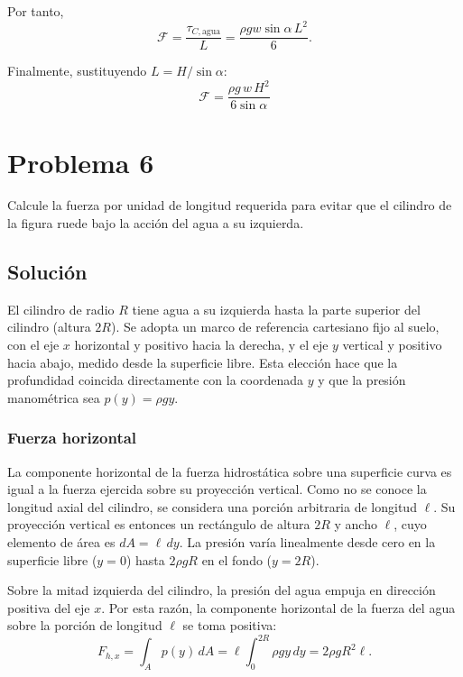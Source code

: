 \documentclass[a4paper]{article}
\begin{document}
Por tanto,
$$
\mathcal{F}=\frac{\tau_{C,\text{agua}}}{L}
=\frac{\rho g w\sin\alpha\,L^2}{6}.
$$

Finalmente, sustituyendo $L=H/\sin\alpha$:
$$
\boxed{\mathcal{F} = \frac{\rho g\, w\, H^2}{6\sin\alpha}}
$$

\section{Problema 6}
Calcule la fuerza por unidad de longitud requerida para evitar que el cilindro de la figura ruede bajo la acción del agua a su izquierda.



\subsection{Solución}

El cilindro de radio $R$ tiene agua a su izquierda hasta la parte superior del cilindro (altura $2R$). Se adopta un marco de referencia cartesiano fijo al suelo, con el eje $x$ horizontal y positivo hacia la derecha, y el eje $y$ vertical y positivo hacia abajo, medido desde la superficie libre. Esta elección hace que la profundidad coincida directamente con la coordenada $y$ y que la presión manométrica sea $p(y)=\rho g y$.

\subsubsection{Fuerza horizontal}

La componente horizontal de la fuerza hidrostática sobre una superficie curva es igual a la fuerza ejercida sobre su proyección vertical. Como no se conoce la longitud axial del cilindro, se considera una porción arbitraria de longitud $\ell$. Su proyección vertical es entonces un rectángulo de altura $2R$ y ancho $\ell$, cuyo elemento de área es $dA=\ell\,dy$. La presión varía linealmente desde cero en la superficie libre ($y=0$) hasta $2\rho gR$ en el fondo ($y=2R$).



Sobre la mitad izquierda del cilindro, la presión del agua empuja en dirección positiva del eje $x$. Por esta razón, la componente horizontal de la fuerza del agua sobre la porción de longitud $\ell$ se toma positiva:
$$
F_{h,x}=\int_A p(y)\,dA
=\ell\int_0^{2R}\rho gy\,dy
=2\rho gR^2\ell.
$$
\end{document}
